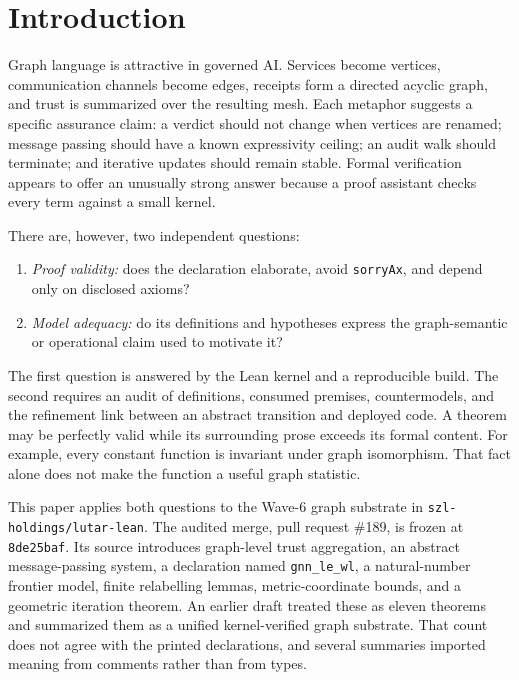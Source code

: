 \documentclass[10pt,letterpaper]{article}
\theoremstyle{definition}
\newcommand{\shortcommit}{\texttt{8de25baf}}
\begin{document}
\section{Introduction}\label{sec:intro}

Graph language is attractive in governed AI. Services become vertices,
communication channels become edges, receipts form a directed acyclic graph,
and trust is summarized over the resulting mesh. Each metaphor suggests a
specific assurance claim: a verdict should not change when vertices are
renamed; message passing should have a known expressivity ceiling; an audit
walk should terminate; and iterative updates should remain stable. Formal
verification appears to offer an unusually strong answer because a proof
assistant checks every term against a small kernel.

There are, however, two independent questions:
\begin{enumerate}
\item \emph{Proof validity:} does the declaration elaborate, avoid
  \texttt{sorryAx}, and depend only on disclosed axioms?
\item \emph{Model adequacy:} do its definitions and hypotheses express the
  graph-semantic or operational claim used to motivate it?
\end{enumerate}
The first question is answered by the Lean kernel and a reproducible build. The
second requires an audit of definitions, consumed premises, countermodels, and
the refinement link between an abstract transition and deployed code. A theorem
may be perfectly valid while its surrounding prose exceeds its formal content.
For example, every constant function is invariant under graph isomorphism. That
fact alone does not make the function a useful graph statistic.

This paper applies both questions to the Wave-6 graph substrate in
\texttt{szl-holdings/lutar-lean}. The audited merge, pull request \#189, is
frozen at \shortcommit. Its source introduces graph-level trust aggregation,
an abstract message-passing system, a declaration named
\texttt{gnn\_le\_wl}, a natural-number frontier model, finite relabelling
lemmas, metric-coordinate bounds, and a geometric iteration theorem. An earlier
draft treated these as eleven theorems and summarized them as a unified
kernel-verified graph substrate. That count does not agree with the printed
declarations, and several summaries imported meaning from comments rather than
from types.
\end{document}
